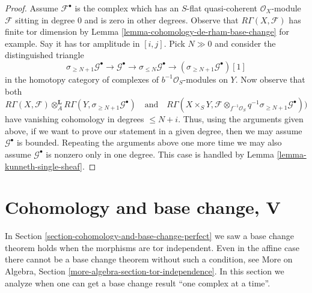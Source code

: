 \begin{proof}
\medskip\noindent
Assume $\mathcal{F}^\bullet$ is the complex which has an $S$-flat quasi-coherent
$\mathcal{O}_X$-module $\mathcal{F}$ sitting in degree $0$ and is zero in
other degrees. Observe that $R\Gamma(X, \mathcal{F})$ has finite
tor dimension by Lemma \ref{lemma-cohomology-de-rham-base-change} for example.
Say it has tor amplitude in $[i, j]$.
Pick $N \gg 0$ and consider the distinguished triangle
$$
\sigma_{\geq N + 1}\mathcal{G}^\bullet \to
\mathcal{G}^\bullet \to
\sigma_{\leq N}\mathcal{G}^\bullet \to
(\sigma_{\geq N + 1}\mathcal{G}^\bullet)[1]
$$
in the homotopy category of complexes of $b^{-1}\mathcal{O}_S$-modules on $Y$.
Now observe that both
$$
R\Gamma(X, \mathcal{F})
\otimes_A^\mathbf{L}
R\Gamma(Y, \sigma_{\geq N + 1}\mathcal{G}^\bullet)
\quad\text{and}\quad
R\Gamma(X \times_S Y,
\mathcal{F} \otimes_{f^{-1}\mathcal{O}_S}
q^{-1}\sigma_{\geq N + 1}\mathcal{G}^\bullet))
$$
have vanishing cohomology in degrees $\leq N + i$. Thus, using the arguments
given above, if we want to prove our statement in a given degree, then we may
assume $\mathcal{G}^\bullet$ is bounded.
Repeating the arguments above one more time we may also assume
$\mathcal{G}^\bullet$ is nonzero only in one degree.
This case is handled by Lemma \ref{lemma-kunneth-single-sheaf}.
\end{proof}










\section{Cohomology and base change, V}
\label{section-cohomology-base-change}

\noindent
In Section \ref{section-cohomology-and-base-change-perfect}
we saw a base change theorem holds when the morphisms are tor independent.
Even in the affine case there cannot be a base change theorem without such
a condition, see
More on Algebra, Section \ref{more-algebra-section-tor-independence}.
In this section we analyze when one can get a base change result
``one complex at a time''.

